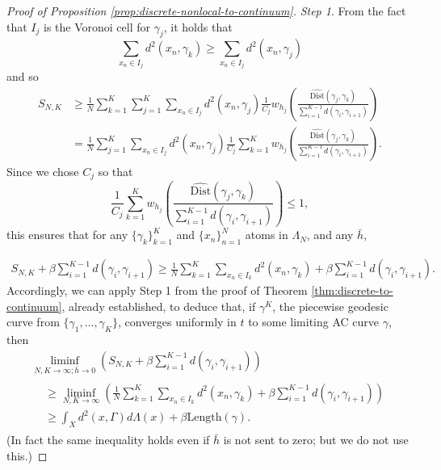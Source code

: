 \documentclass[aos, preprint]{imsart}
\theoremstyle{plain}
\theoremstyle{remark}
\begin{document}
\begin{appendix}
\begin{proof}[Proof of Proposition \ref{prop:discrete-nonlocal-to-continuum}]
\emph{Step 1}. From the fact that $I_{j}$
is the Voronoi cell for $\gamma_{j}$, it holds that
\[
\sum_{x_{n}\in I_{j}}d^{2}(x_{n},\gamma_{k})\geq\sum_{x_{n}\in I_{j}}d^{2}(x_{n},\gamma_{j})
\]
and so
\begin{align*}
 S_{N,K} & \geq\frac{1}{N}\sum_{k=1}^{K}\sum_{j=1}^{K}\sum_{x_{n}\in I_{j}}d^{2}(x_{n},\gamma_{j})\frac{1}{C_{j}}w_{h_{j}}\left(\frac{\widehat{\text{Dist}}(\gamma_{j},\gamma_{k})}{\sum_{i=1}^{K-1}d(\gamma_{i},\gamma_{i+1})}\right)\\
 & =\frac{1}{N}\sum_{j=1}^{K}\sum_{x_{n}\in I_{j}}d^{2}(x_{n},\gamma_{j})\frac{1}{C_{j}}\sum_{k=1}^{K}w_{h_{j}}\left(\frac{\widehat{\text{Dist}}(\gamma_{j},\gamma_{k})}{\sum_{i=1}^{K-1}d(\gamma_{i},\gamma_{i+1})}\right).
\end{align*}
Since we chose $C_{j}$ so that
\[
\frac{1}{C_{j}}\sum_{k=1}^{K}w_{h_{j}}\left(\frac{\widehat{\text{Dist}}(\gamma_{j},\gamma_{k})}{\sum_{i=1}^{K-1}d(\gamma_{i},\gamma_{i+1})}\right) \leq 1,
\]
this ensures that for any $\{\gamma_{k}\}_{k=1}^{K}$ and $\{x_{n}\}_{n=1}^{N}$
atoms in $\Lambda_{N}$, and any $\bar{h}$,

\begin{align*}
 S_{N,K}
+\beta\sum_{i=1}^{K-1}d(\gamma_{i},\gamma_{i+1})
\geq\frac{1}{N}\sum_{k=1}^{K}\sum_{x_{n}\in I_{k}}d^{2}(x_{n},\gamma_{k})+\beta\sum_{i=1}^{K-1}d(\gamma_{i},\gamma_{i+1}).
\end{align*}
Accordingly, we can apply Step 1 from the proof of Theorem \ref{thm:discrete-to-continuum},
already established, to deduce that,
 if $\gamma^{K}$, the piecewise geodesic curve from $\{\gamma_1, ..., \gamma_K\}$,  converges uniformly in $t$ to some limiting
AC curve $\gamma$, then
\begin{multline*}
\liminf_{N,K\rightarrow\infty;\bar{h}\rightarrow0}\left(
S_{N,K} +\beta\sum_{i=1}^{K-1}d(\gamma_{i},\gamma_{i+1})\right)\\
\begin{aligned}
& \geq\liminf_{N,K\rightarrow\infty}\left(\frac{1}{N}\sum_{k=1}^{K}\sum_{x_{n}\in I_{k}}d^{2}(x_{n},\gamma_{k})+\beta\sum_{i=1}^{K-1}d(\gamma_{i},\gamma_{i+1})\right)\\
 & \geq\int_{X}d^{2}(x,\Gamma)d\Lambda(x)+ \beta \text{Length}(\gamma).
\end{aligned}
\end{multline*}
(In fact the same inequality holds even if $\bar{h}$ is not sent
to zero; but we do not use this.)



\end{proof}
\end{appendix}
\end{document}
